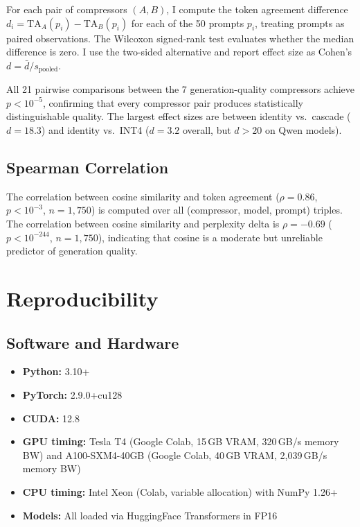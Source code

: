 \documentclass{article}
\begin{document}
For each pair of compressors $(A, B)$, I compute the token agreement difference $d_i = \text{TA}_A(p_i) - \text{TA}_B(p_i)$ for each of the 50 prompts $p_i$, treating prompts as paired observations. The Wilcoxon signed-rank test evaluates whether the median difference is zero. I use the two-sided alternative and report effect size as Cohen's $d = \bar{d} / s_{\text{pooled}}$.

All 21 pairwise comparisons between the 7 generation-quality compressors achieve $p < 10^{-5}$, confirming that every compressor pair produces statistically distinguishable quality. The largest effect sizes are between identity vs.\ cascade ($d = 18.3$) and identity vs.\ INT4 ($d = 3.2$ overall, but $d > 20$ on Qwen models).

\subsection{Spearman Correlation}

The correlation between cosine similarity and token agreement ($\rho = 0.86$, $p < 10^{-3}$, $n = 1{,}750$) is computed over all (compressor, model, prompt) triples. The correlation between cosine similarity and perplexity delta is $\rho = -0.69$ ($p < 10^{-244}$, $n = 1{,}750$), indicating that cosine is a moderate but unreliable predictor of generation quality.

\section{Reproducibility}
\label{app:reproducibility}

\subsection{Software and Hardware}

\begin{itemize}    \item \textbf{Python:} 3.10+
    \item \textbf{PyTorch:} 2.9.0+cu128
    \item \textbf{CUDA:} 12.8
    \item \textbf{GPU timing:} Tesla T4 (Google Colab, 15\,GB VRAM, 320\,GB/s memory BW) and A100-SXM4-40GB (Google Colab, 40\,GB VRAM, 2{,}039\,GB/s memory BW)
    \item \textbf{CPU timing:} Intel Xeon (Colab, variable allocation) with NumPy 1.26+
    \item \textbf{Models:} All loaded via HuggingFace Transformers in FP16
\end{itemize}
\end{document}
